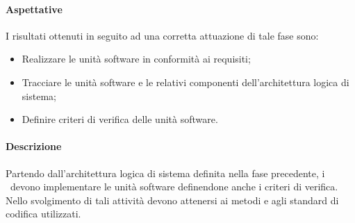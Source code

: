 \documentclass[../NormeDiProgetto.tex]{subfiles}
\begin{document}
			\paragraph{Aspettative\\}
				I risultati ottenuti in seguito ad una corretta attuazione di tale fase sono:
				\begin{itemize}
					\item Realizzare le unità software in conformità ai requisiti;
					\item Tracciare le unità software e le relativi componenti dell'architettura
					logica di sistema;
					\item Definire criteri di verifica delle unità software.
				\end{itemize}
			\paragraph{Descrizione\\}
				Partendo dall'architettura logica di sistema definita nella fase precedente, i
				\programmatori\ devono implementare le unità software definendone anche i criteri di
				verifica. Nello svolgimento di tali attività devono attenersi ai metodi e
				agli standard di codifica utilizzati.
\end{document}
